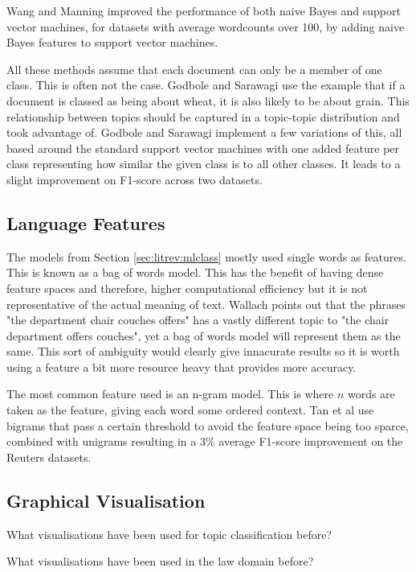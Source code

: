 			Wang and Manning improved the performance of both naive Bayes and support vector machines, for datasets with average wordcounts over 100, by adding naive Bayes features to support vector machines\cite{baselines_bigrams_wang}. 
			
			All these methods assume that each document can only be a member of one class. This is often not the case. Godbole and Sarawagi use the example that if a document is classed as being about wheat, it is also likely to be about grain\cite{discriminative_multilabel_godbole}. This relationship between topics should be captured in a topic-topic distribution and took advantage of. Godbole and Sarawagi implement a few variations of this, all based around the standard support vector machines with one added feature per class representing how similar the given class is to all other classes. It leads to a slight improvement on F1-score across two datasets.
			
		\subsection{Language Features} \label{sec:litrev:langfeat}	
			The models from Section \ref{sec:litrev:mlclass} mostly used single words as features. This is known as a bag of words model. This has the benefit of having dense feature spaces and therefore, higher computational efficiency but it is not representative of the actual meaning of text. Wallach points out that the phrases "the department chair couches offers" has a vastly different topic to "the chair department offers couches", yet a bag of words model will represent them as the same\cite{beyond_bag_wallach}. This sort of ambiguity would clearly give innacurate results so it is worth using a feature a bit more resource heavy that provides more accuracy.
			
			The most common feature used is an n-gram model. This is where $n$ words are taken as the feature, giving each word some ordered context. Tan et al use bigrams that pass a certain threshold to avoid the feature space being too sparce, combined with unigrams resulting in a 3\% average F1-score improvement on the Reuters datasets\cite{bigrams_enhance_categorisation}.
		\subsection{Graphical Visualisation}
			What visualisations have been used for topic classification before?
			
			What visualisations have been used in the law domain before?
